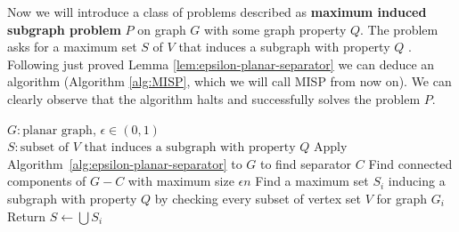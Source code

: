 Now we will introduce a class of problems described as \textbf{maximum induced
	subgraph problem} $P$ on graph $G$ with some graph property $Q$. The problem
asks for a maximum set $S$ of $V$ that induces a subgraph with property $Q$
\cite{chibaApplicationsLiptonTarjans1981}. Following just proved Lemma \ref{lem:epsilon-planar-separator}
we can deduce an algorithm (Algorithm \ref{alg:MISP}, which we will call \textsc{MISP} from now on). We can clearly observe that the algorithm halts and successfully
solves the problem $P$.
\begin{algorithm}[H]\caption{\textsc{MISP} algorithm}\label{alg:MISP}
	\begin{algorithmic}[1]
        \Require $G \colon \text{planar graph}$, $\epsilon \in (0,1)$
        \Ensure $S \colon \text{subset of $V$ that induces a subgraph with property $Q$}$
        \State Apply Algorithm~\ref{alg:epsilon-planar-separator} to $G$  
		to find separator $C$
        \State Find connected components of $G - C$ with maximum size $\epsilon n$
		\State Find a maximum set $S_i$ inducing a subgraph
		with property $Q$ by checking every subset of vertex set $V$ for graph $G_i$
        \EndFor
		\State Return $S \gets \bigcup S_i$
	\end{algorithmic}
\end{algorithm}

